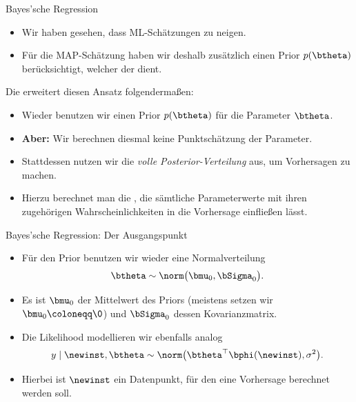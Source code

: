 \begin{frame}{Bayes'sche Regression}{}
	\begin{itemize}
		\item Wir haben gesehen, dass ML-Schätzungen zu  neigen.
		\item Für die MAP-Schätzung haben wir deshalb zusätzlich einen Prior $p(\btheta)$ berücksichtigt, welcher der  dient.
	\end{itemize}
	
	\begin{boxGray}
		Die  erweitert diesen Ansatz folgendermaßen:

		\begin{itemize}
			\item Wieder benutzen wir einen Prior $p(\btheta)$ für die Parameter $\btheta$.
			\item \textbf{Aber:} Wir berechnen diesmal keine Punktschätzung der Parameter.
			\item Stattdessen nutzen wir die \textit{volle Posterior-Verteilung} aus, um Vorhersagen zu machen.
			\item Hierzu berechnet man die , die sämtliche Parameterwerte mit
				ihren zugehörigen Wahrscheinlichkeiten in die Vorhersage einfließen lässt.
		\end{itemize}
	\end{boxGray}
\end{frame}


\begin{frame}{Bayes'sche Regression: Der Ausgangspunkt}{}
	\begin{itemize}
		\item Für den Prior benutzen wir wieder eine Normalverteilung
		\begin{equation}
			\btheta \sim \norm\bigl( \bmu_0, \bSigma_0 \bigr).
		\end{equation}
		\item Es ist $\bmu_0$ der Mittelwert des Priors (meistens setzen wir $\bmu_0 \coloneqq \0$) und $\bSigma_0$ dessen Kovarianzmatrix.
		\item Die Likelihood modellieren wir ebenfalls analog
		\begin{equation}
			y \mid \newinst, \btheta \sim \norm\bigl( \btheta^\top \bphi(\newinst), \sigma^2 \bigr).
		\end{equation}
		\item Hierbei ist $\newinst$ ein Datenpunkt, für den eine Vorhersage berechnet werden soll.
	\end{itemize}
\end{frame}


